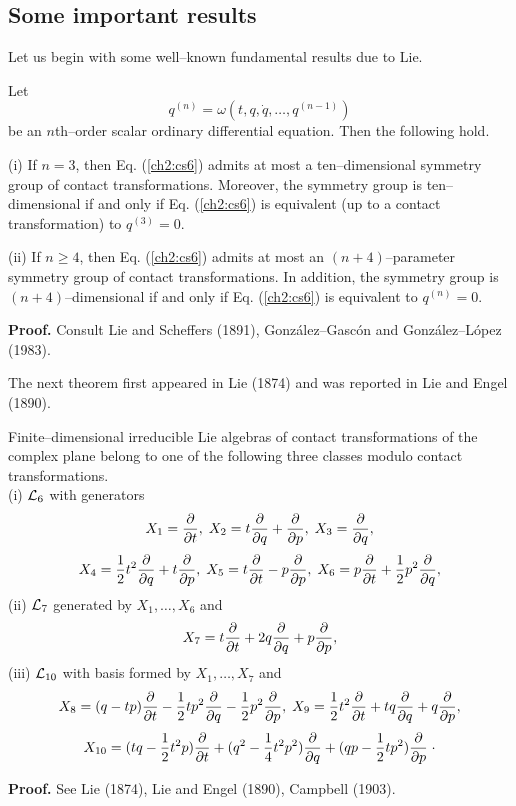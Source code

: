 \subsection{Some important results}
Let us begin with some well--known fundamental results due to Lie.
\begin{theo}
\begin{em}
Let
\begin{equation}
\label{ch2:cs6}
q^{(n)}=\omega (t,q,\dot q,\ldots, q^{(n-1)})
\end{equation}
 be an  $n$th--order scalar
ordinary differential equation. Then the following hold.

(i) If $n=3$, then Eq. (\ref{ch2:cs6}) admits at most a ten--dimensional symmetry
group of contact transformations. Moreover, the symmetry group is
ten--dimensional if and only if Eq. (\ref{ch2:cs6}) is equivalent
(up to a contact transformation) to $q^{(3)}=0.$

(ii) If $n\ge 4$, then Eq. (\ref{ch2:cs6}) admits at most an $(n+4)$--parameter
symmetry group of contact transformations. In addition, the symmetry group
is $(n+4 )$--dimensional if and only if Eq. (\ref{ch2:cs6}) is equivalent to
$q^{(n)}=0$.
\end{em}
\end{theo}
{\bf Proof.}  Consult Lie and Scheffers (1891), Gonz\'alez--Gasc\'on and  Gonz\'alez--L\'opez
(1983).

The  next theorem first appeared in Lie (1874) and was reported in
Lie and Engel (1890).
\begin{theo}[Lie 1874]
\begin{em}
\label{ch2:liec}
Finite--dimensional irreducible Lie algebras of contact transformations of the complex plane
belong to one of the following  three classes modulo contact transformations.\\
(i) ${\cal L}_6$ with generators
\[ X_1=\displaystyle{\frac{\partial}{\partial t}},\;X_2=t\displaystyle{\frac{\partial}{\partial q }}+\displaystyle{\frac{\partial}{\partial p }},\;X_3=\displaystyle{\frac{\partial}{\partial q }},\]
\[X_4=\frac{1}{2}t^2\displaystyle{\frac{\partial}{\partial q }}+t\displaystyle{\frac{\partial}{\partial p }},\;
X_5=t\displaystyle{\frac{\partial}{\partial t}}-p\displaystyle{\frac{\partial}{\partial p }},\;X_6=p\displaystyle{\frac{\partial}{\partial t}}+\frac{1}{2}p^2\displaystyle{\frac{\partial}{\partial q }},\]
(ii) ${\cal L}_7$ generated by  $X_1,\ldots,X_6$ and
\[X_7=t\displaystyle{\frac{\partial}{\partial t}}+2q\displaystyle{\frac{\partial}{\partial q }}+p\displaystyle{\frac{\partial}{\partial p }} ,\]
(iii) ${\cal L}_{10}$  with basis formed by $X_1,\ldots,X_7$ and
\[X_8=(q-tp)\displaystyle{\frac{\partial}{\partial t}}-\frac{1}{2}tp^2\displaystyle{\frac{\partial}{\partial q }}-\frac{1}{2}p^2\displaystyle{\frac{\partial}{\partial p }},\;
  X_9 = \frac{1}{2}t^2\displaystyle{\frac{\partial}{\partial t}}+tq\displaystyle{\frac{\partial}{\partial q }}+q\displaystyle{\frac{\partial}{\partial p }},\]
\[  X_{10}= (tq-\frac{1}{2}t^2p)\displaystyle{\frac{\partial}{\partial t}}+(q^2-\frac{1}{4}t^2p^2)\displaystyle{\frac{\partial}{\partial q }}
  +(qp-\frac{1}{2}tp^2)\displaystyle{\frac{\partial}{\partial p }} \; \cdot \]
\end{em}
\end{theo}

{\bf Proof.} See Lie (1874), Lie and Engel (1890), Campbell (1903).\\ 

